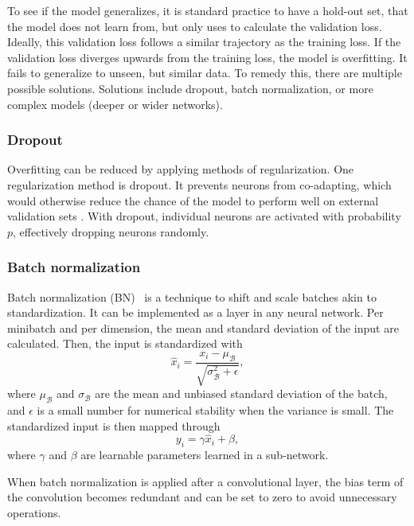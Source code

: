 To see if the model generalizes, it is standard practice to have a hold-out set, that the model does not learn from, but only uses to calculate the validation loss.
Ideally, this validation loss follows a similar trajectory as the training loss.
If the validation loss diverges upwards from the training loss, the model is overfitting.
It fails to generalize to unseen, but similar data.
To remedy this, there are multiple possible solutions.
Solutions include dropout, batch normalization, or more complex models (\ie deeper or wider networks).

\subsubsection{Dropout}\label{sec:dropout}
Overfitting can be reduced by applying methods of regularization.
One regularization method is dropout.
It prevents neurons from co-adapting, which would otherwise reduce the chance of the model to perform well on external validation sets \cite{Srivastava2014}.
With dropout, individual neurons are activated with probability $p$, effectively dropping neurons randomly.

\subsubsection{Batch normalization}\label{sec:bn}
Batch normalization (BN)~\cite{Ioffe2015} is a technique to shift and scale batches akin to standardization.
It can be implemented as a layer in any neural network.
Per minibatch and per dimension, the mean and standard deviation of the input are calculated.
Then, the input is standardized with
\begin{equation}
    \hat{x}_i = \frac{x_i - \mu_\mathcal{B}}{\sqrt{\sigma_\mathcal{B}^2 + \epsilon}},
\end{equation}
where $\mu_\mathcal{B}$ and $\sigma_\mathcal{B}$ are the mean and unbiased standard deviation of the batch, and $\epsilon$ is a small number for numerical stability when the variance is small.
The standardized input is then mapped through
\begin{equation}
    y_i = \gamma \hat{x}_i + \beta,
\end{equation}
where $\gamma$ and $\beta$ are learnable parameters learned in a sub-network.

When batch normalization is applied after a convolutional layer, the bias term of the convolution becomes redundant and can be set to zero to avoid unnecessary operations.

